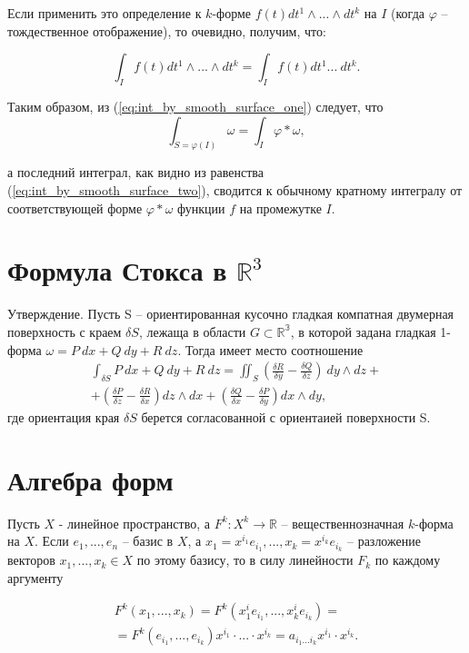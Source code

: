\documentclass[a4paper, 12pt]{extarticle} %
\begin{document}
Если применить это определение к $k$-форме $f(t) dt^1 \land ...\land dt^k$ на $I$ (когда $\varphi$ -- тождественное отображение), то очевидно, получим, что:

\[
    \int_I f(t) dt^1 \land ... \land dt^k = \int_I f(t) dt^1 ... \ dt^k.
    \label{eq:int_by_smooth_surface_two}
\]

Таким образом, из (\ref{eq:int_by_smooth_surface_one}) следует, что
\begin{equation}
    \int_{S = \varphi(I)} \omega = \int_I \varphi * \omega,
\end{equation}

а последний интеграл, как видно из равенства (\ref{eq:int_by_smooth_surface_two}), сводится к обычному кратному интегралу от соответствующей форме $\varphi * \omega$ функции $f$ на промежутке $I$.

\clearpage
\section*{Формула Стокса в $\mathbb{R}^3$}
Утверждение. Пусть S -- ориентированная кусочно гладкая компатная двумерная поверхность с краем $\delta S$, лежаща в области $G \subset \mathbb{R^3}$, в которой задана гладкая 1-форма $\omega = P\ dx + Q\ dy + R\ dz$. Тогда имеет место соотношение
\begin{eqnarray*}
    \int_{\delta S} P\ dx + Q\ dy + R\ dz = \iint_S \left( \frac{\delta R}{\delta y} - \frac{\delta Q}{\delta z} \right) \ dy \land dz + \\ + \left(\frac{\delta P}{\delta z} - \frac{\delta R}{\delta x}\right) dz \land dx + \left(\frac{\delta Q}{\delta x} - \frac{\delta P}{\delta y}\right) dx \land dy,
\end{eqnarray*}
где ориентация края $\delta S$ берется согласованной с ориентаией поверхности S.

\clearpage

\section*{Алгебра форм}
Пусть $X$ - линейное пространство, а $F^k : X^k \to \mathbb{R}$ -- вещественнозначная $k$-форма на $X$. Если $e_1, ..., e_n$ -- базис в $X$, а $x_1 = x^{i_1} e_{i_1}, ..., x_k = x^{i_k} e_{i_k}$ -- разложение векторов $x_1, ..., x_k \in X$ по этому базису, то в силу линейности $F_k$ по каждому аргументу

\begin{eqnarray}
    F^k(x_1,...,x_k) = F^k(x^i_1 e_{i_1}, ..., x^i_k e_{i_k}) = \\ = F^k(e_{i_1}, ..., e_{i_k}) x^{i_1} \cdot  ... \cdot x^{i_k} = a_{i_1 ... i_k} x^{i_1} \cdot x^{i_k}.
\end{eqnarray}
\end{document}
